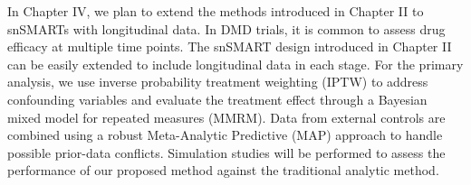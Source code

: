 In Chapter IV, we plan to extend the methods introduced in Chapter II to snSMARTs with longitudinal data. In DMD trials, it is common to assess drug efficacy at multiple time points. The snSMART design introduced in Chapter II can be easily extended to include longitudinal data in each stage. For the primary analysis, we use inverse probability treatment weighting (IPTW) to address confounding variables and evaluate the treatment effect through a Bayesian mixed model for repeated measures (MMRM). Data from external controls are combined using a robust Meta-Analytic Predictive (MAP) approach to handle possible prior-data conflicts. Simulation studies will be performed to assess the performance of our proposed method against the traditional analytic method.